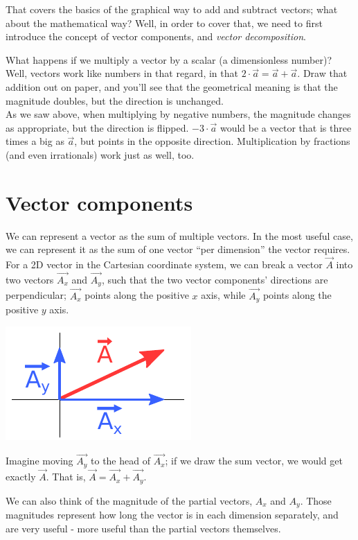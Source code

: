 \documentclass[12pt,a4paper]{report}
\begin{document}
That covers the basics of the graphical way to add and subtract vectors; what about the mathematical way? Well, in order to cover that, we need to first introduce the concept of vector components, and \emph{vector decomposition}.

What happens if we multiply a vector by a scalar (a dimensionless number)? Well, vectors work like numbers in that regard, in that $2 \cdot \vec{a} = \vec{a} + \vec{a}$. Draw that addition out on paper, and you'll see that the geometrical meaning is that the magnitude doubles, but the direction is unchanged.\\
As we saw above, when multiplying by negative numbers, the magnitude changes as appropriate, but the direction is flipped. $-3 \cdot \vec{a}$ would be a vector that is three times a big as $\vec{a}$, but points in the opposite direction. Multiplication by fractions (and even irrationals) work just as well, too.

\section{Vector components}

We can represent a vector as the sum of multiple vectors. In the most useful case, we can represent it as the sum of one vector ``per dimension'' the vector requires.\\
For a 2D vector in the Cartesian coordinate system, we can break a vector $\vec{A}$ into two vectors $\vec{A_x}$ and $\vec{A_y}$, such that the two vector components' directions are perpendicular; $\vec{A_x}$ points along the positive $x$ axis, while $\vec{A_y}$ points along the positive $y$ axis.

\includegraphics[scale=1.0]{Graphics/vectors/vectorcomponents}

Imagine moving $\vec{A_y}$ to the head of $\vec{A_x}$; if we draw the sum vector, we would get exactly $\vec{A}$. That is, $\vec{A} = \vec{A_x} + \vec{A_y}$.

We can also think of the magnitude of the partial vectors, $A_x$ and $A_y$. Those magnitudes represent how long the vector is in each dimension separately, and are very useful - more useful than the partial vectors themselves.
\end{document}
